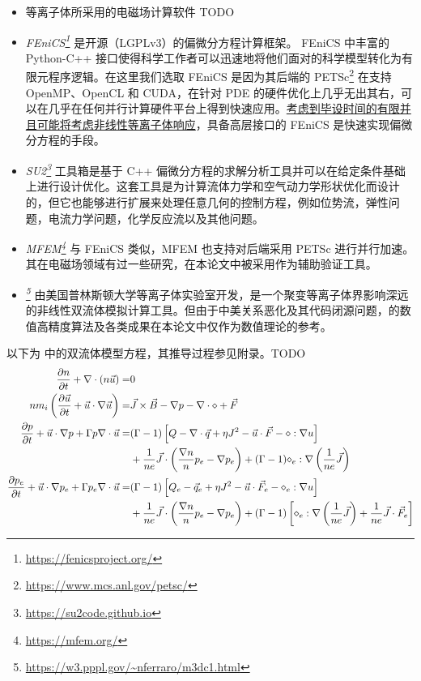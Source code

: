 \begin{itemize}
    \item 等离子体所采用的电磁场计算软件 TODO
    \item \textit{FEniCS\footnote{\url{https://fenicsproject.org/}}} 是开源（LGPLv3）的偏微分方程计算框架。 FEniCS 中丰富的 Python-C++ 接口使得科学工作者可以迅速地将他们面对的科学模型转化为有限元程序逻辑。在这里我们选取 FEniCS 是因为其后端的 PETSc\footnote{\url{https://www.mcs.anl.gov/petsc/}} 在支持 OpenMP、OpenCL 和 CUDA，在针对 PDE 的硬件优化上几乎无出其右，可以在几乎在任何并行计算硬件平台上得到快速应用。\underline{考虑到毕设时间的有限并且可能将考虑非线性等离子体响应}，具备高层接口的 FEniCS 是快速实现偏微分方程的手段。
    \item \textit{SU2\footnote{\url{https://su2code.github.io}}} 工具箱是基于 C++ 偏微分方程的求解分析工具并可以在给定条件基础上进行设计优化。这套工具是为计算流体力学和空气动力学形状优化而设计的，但它也能够进行扩展来处理任意几何的控制方程，例如位势流，弹性问题，电流力学问题，化学反应流以及其他问题。
    \item \textit{MFEM\footnote{\url{https://mfem.org/}}} 与 FEniCS 类似，MFEM 也支持对后端采用 PETSc 进行并行加速。其在电磁场领域有过一些研究，在本论文中被采用作为辅助验证工具。
    \item \textit{\mdddc \footnote{\url{https://w3.pppl.gov/~nferraro/m3dc1.html}}} 由美国普林斯顿大学等离子体实验室开发，是一个聚变等离子体界影响深远的非线性双流体模拟计算工具。但由于中美关系恶化及其代码闭源问题，\mdddc 的数值高精度算法及各类成果在本论文中仅作为数值理论的参考。
\end{itemize}



以下为 \mdddc 中的双流体模型方程，其推导过程参见附录。TODO
\begin{equation}\begin{aligned}
    \frac{\partial n}{\partial t}+\nabla \cdot(n \vec{u})=& 0 \\
    n m_{i}\left(\frac{\partial \vec{u}}{\partial t}+\vec{u} \cdot \nabla \vec{u}\right)=& \vec{J} \times \vec{B}-\nabla p-\nabla \cdot\mathcal{\Pi}+\vec{F} \\
    \frac{\partial p}{\partial t}+\vec{u} \cdot \nabla p+\Gamma p \nabla \cdot \vec{u}=&(\Gamma-1)\left[Q-\nabla \cdot \vec{q}+\eta J^{2}-\vec{u} \cdot \vec{F}-\mathcal{\Pi}: \nabla u\right] \\
    &+\frac{1}{n e} \vec{J} \cdot\left(\frac{\nabla n}{n} p_{e}-\nabla p_{e}\right)+(\Gamma-1) \mathcal{\Pi}_{e}: \nabla\left(\frac{1}{n e} \vec{J}\right) \\
    \frac{\partial p_{e}}{\partial t}+\vec{u} \cdot \nabla p_{e}+\Gamma p_{e} \nabla \cdot \vec{u}=&(\Gamma-1)\left[Q_{e}-\vec{q}_{e}+\eta J^{2}-\vec{u} \cdot \vec{F}_{e}-\mathcal{\Pi}_{e}: \nabla u\right] \\
    &+\frac{1}{n e} \vec{J} \cdot\left(\frac{\nabla n}{n} p_{e}-\nabla p_{e}\right)+(\Gamma-1)\left[\mathcal{\Pi}_{e}: \nabla\left(\frac{1}{n e} \vec{J}\right)+\frac{1}{n e} \vec{J} \cdot \vec{F}_{e}\right]
\end{aligned}\end{equation}

